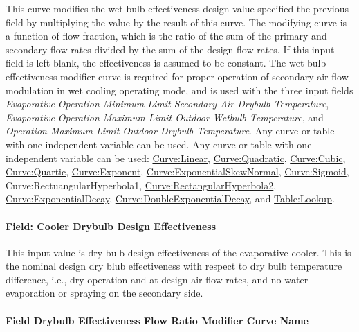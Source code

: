 This curve modifies the wet bulb effectiveness design value specified the previous field by multiplying the value by the result of this curve. The modifying curve is a function of flow fraction, which is the ratio of the sum of the primary and secondary flow rates divided by the sum of the design flow rates. If this input field is left blank, the effectiveness is assumed to be constant. The wet bulb effectiveness modifier curve is required for proper operation of secondary air flow modulation in wet cooling operating mode, and is used with the three input fields \textit{Evaporative Operation Minimum Limit Secondary Air Drybulb Temperature}, \textit{Evaporative Operation Maximum Limit Outdoor Wetbulb Temperature}, and \textit{Operation Maximum Limit Outdoor Drybulb Temperature}. Any curve or table with one independent variable can be used. Any curve or table with one independent variable can be used: \hyperref[curvelinear]{Curve:Linear}, \hyperref[curvequadratic]{Curve:Quadratic}, \hyperref[curvecubic]{Curve:Cubic}, \hyperref[curvequartic]{Curve:Quartic}, \hyperref[curveexponent]{Curve:Exponent}, \hyperref[curveexponentialskewnormal]{Curve:ExponentialSkewNormal}, \hyperref[curvesigmoid]{Curve:Sigmoid}, Curve:RectuangularHyperbola1, \hyperref[curverectangularhyperbola2]{Curve:RectangularHyperbola2}, \hyperref[curveexponentialdecay]{Curve:ExponentialDecay}, \hyperref[curvedoubleexponentialdecay]{Curve:DoubleExponentialDecay}, and \hyperref[tablelookup]{Table:Lookup}.

\paragraph{Field: Cooler Drybulb Design Effectiveness}\label{field-cooler-drybulb-design-effectiveness}

This input value is dry bulb design effectiveness of the evaporative cooler. This is the nominal design dry blub effectiveness with respect to dry bulb temperature difference, i.e., dry operation and at design air flow rates, and no water evaporation or spraying on the secondary side.

\paragraph{Field Drybulb Effectiveness Flow Ratio Modifier Curve Name}\label{field-drybulb-effectiveness-flow-ratio-modifier-curve-name}

